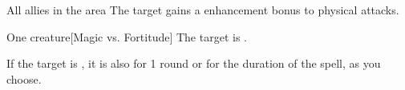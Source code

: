 \begin{spellheader}
\end{spellheader}
\begin{spelleffects}
    \begin{spelltargets}{All allies in the area}
        \spelleffect The target gains a  enhancement bonus to physical attacks. \spellbonusscalingdescription
    \end{spelltargets}
\end{spelleffects}
\begin{spellfooter}
    
\end{spellfooter}

\begin{spellheader}
    \spellrng{\rngmed}
    \spelldur{\durshort \dismissable}
\end{spellheader}
\begin{spelleffects}
    \begin{spelltarget}{One creature}[Magic vs. Fortitude]
        \spellsuccess The target is \sickened.

        If the target is \bloodied, it is also \blinded for 1 round or \deafened for the duration of the spell, as you choose.
    \end{spelltarget}
\end{spelleffects}
\begin{spellfooter}
    
\end{spellfooter}

